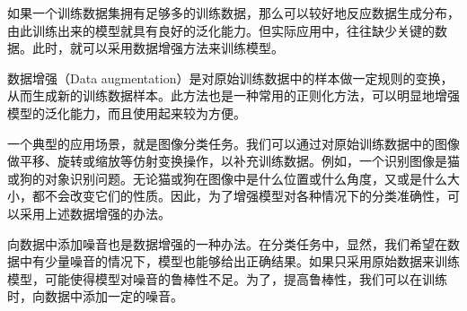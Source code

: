 如果一个训练数据集拥有足够多的训练数据，那么可以较好地反应数据生成分布，由此训练出来的模型就具有良好的泛化能力。但实际应用中，往往缺少关键的数据。此时，就可以采用数据增强方法来训练模型。

数据增强（Data augmentation）是对原始训练数据中的样本做一定规则的变换，从而生成新的训练数据样本。此方法也是一种常用的正则化方法，可以明显地增强模型的泛化能力，而且使用起来较为方便。

一个典型的应用场景，就是图像分类任务。我们可以通过对原始训练数据中的图像做平移、旋转或缩放等仿射变换操作，以补充训练数据。例如，一个识别图像是猫或狗的对象识别问题。无论猫或狗在图像中是什么位置或什么角度，又或是什么大小，都不会改变它们的性质。因此，为了增强模型对各种情况下的分类准确性，可以采用上述数据增强的办法。

向数据中添加噪音也是数据增强的一种办法。在分类任务中，显然，我们希望在数据中有少量噪音的情况下，模型也能够给出正确结果。如果只采用原始数据来训练模型，可能使得模型对噪音的鲁棒性不足。为了，提高鲁棒性，我们可以在训练时，向数据中添加一定的噪音。